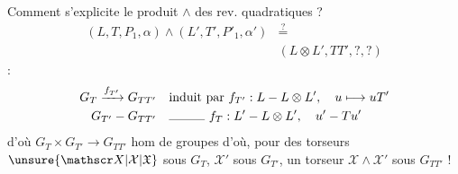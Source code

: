 Comment s'explicite le produit $\wedge$ des rev. quadratiques ?
\[
\begin{aligned}(L,T,P_1,\alpha)\wedge(L',T',P'_1,\alpha')&\overset?={}\\ &(L\otimes L',TT',?,?)\end{aligned}
\]
 :
\[
\begin{aligned}G_T\xrightarrow{f_{T'}}G_{TT'}&\quad\text{induit par } f_{T'}:L\mathbin{-}L\otimes L',\quad u\longmapsto uT'\\G_{T'}\mathbin{-}G_{TT'}&\quad\rule{1cm}{.3pt}\ f_T:L'\mathbin{-}L\otimes L',\quad u'\mathbin{-}Tu'\end{aligned}
\]
d'où $G_T\times G_{T'}\longrightarrow G_{TT'}$ hom de groupes d'où, pour des torseurs $\unsure{\mathscr X|\mathcal X|\mathfrak X}$ sous $G_T$, $\mathscr X'$ sous $G_{T'}$, un torseur $\mathscr X\wedge\mathscr X'$ sous $G_{TT'}$ !
